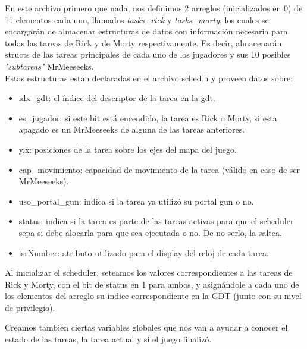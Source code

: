 En este archivo primero que nada, nos definimos 2 arreglos (inicializados en 0) de 11 elementos cada uno,
llamados \emph{tasks_rick} y \emph{tasks_morty}, los cuales se encargarán de almacenar estructuras de datos
con información necesaria para todas las tareas de Rick y de Morty respectivamente. 
Es decir, almacenarán structs de las tareas principales de cada uno de los jugadores y
sus 10 posibles \emph{"subtareas"} MrMeeseeks.
\\
Estas estructuras están declaradas en el archivo sched.h y proveen datos sobre:
\begin{itemize}
    \item idx_gdt: el índice del descriptor de la tarea en la gdt.
    \item es_jugador: si este bit está encendido, la tarea es Rick o Morty, si esta apagado 
    es un MrMeeseeks de alguna de las tareas anteriores.
    \item y,x: posiciones de la tarea sobre los ejes del mapa del juego.
    \item cap_movimiento: capacidad de movimiento de la tarea (válido en caso de ser MrMeeseeks).
    \item uso_portal_gun: indica si la tarea ya utilizó su portal gun o no.
    \item status: indica si la tarea es parte de las tareas activas para que el scheduler
    sepa si debe alocarla para que sea ejecutada o no. De no serlo, la saltea.
    \item isrNumber: atributo utilizado para el display del reloj de cada tarea.
\end{itemize}

Al inicializar el scheduler, seteamos los valores correspondientes a las tareas de
Rick y Morty, con el bit de status en 1 para ambos, y asignándole a cada uno de los 
elementos del arreglo su índice correspondiente en la GDT (junto con su nivel de privilegio).

Creamos tambien ciertas variables globales que nos van a ayudar a conocer el estado de las tareas,
la tarea actual y si el juego finalizó.

